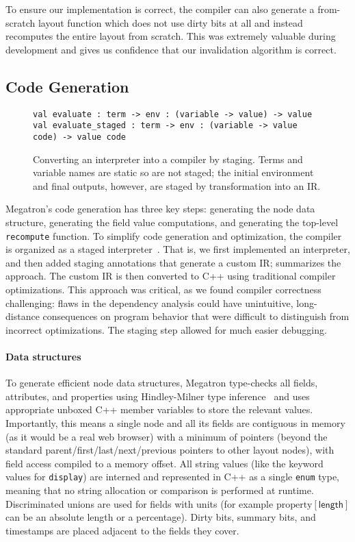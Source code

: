 To ensure our implementation is correct,
  the compiler can also generate a from-scratch layout function
  which does not use dirty bits at all
  and instead recomputes the entire layout from scratch.
This was extremely valuable during development
  and gives us confidence that our invalidation algorithm is correct.

\subsection{Code Generation}

\begin{figure}[bt]
\begin{verbatim}
val evaluate : term -> env : (variable -> value) -> value
val evaluate_staged : term -> env : (variable -> value code) -> value code
\end{verbatim}
\caption{
  Converting an interpreter into a compiler by staging.
  Terms and variable names are static so are not staged;
    the initial environment and final outputs, however,
    are staged by transformation into an IR.}
\label{fig:stage}
\end{figure}

Megatron's code generation has three key steps:
  generating the node data structure,
  generating the field value computations,
  and generating the top-level \texttt{recompute} function.
To simplify code generation and optimization,
  the compiler is organized as a staged interpreter~\cite{MetaOCaml}.
That is, we first implemented an interpreter,
  and then added staging annotations that generate a custom IR;
   summarizes the approach.
The custom IR is then converted to C++
  using traditional compiler optimizations.
This approach was critical,
  as we found compiler correctness challenging:
  flaws in the dependency analysis could have unintuitive,
  long-distance consequences on program behavior
  that were difficult to distinguish from incorrect optimizations.
The staging step allowed for much easier debugging.

\paragraph{Data structures}
To generate efficient node data structures,
  Megatron type-checks all fields, attributes, and properties
  using Hindley-Milner type inference~\cite{HM}
  and uses appropriate unboxed C++ member variables
  to store the relevant values.
Importantly, this means a single node and all its fields
  are contiguous in memory
  (as it would be a real web browser)
  with a minimum of pointers
  (beyond the standard parent/first/last/next/previous pointers
  to other layout nodes),
  with field access compiled to a memory offset.
All string values (like the keyword values for \texttt{display})
  are interned and represented in C++ as
  a single \texttt{enum} type,
  meaning that no string allocation or comparison
  is performed at runtime.
Discriminated unions are used for fields with units
  (for example $\text{property}[\mathsf{length}]$
    can be an absolute length or a percentage).
Dirty bits, summary bits, and timestamps
  are placed adjacent to the fields they cover.

